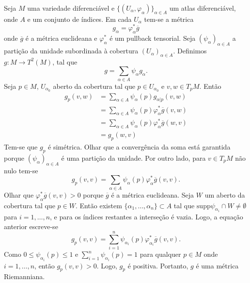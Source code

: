 \begin{demonstracao}
	Seja $M$ uma variedade diferenciável e $\{ (U_{\alpha}, \varphi_{\alpha}) \}_{\alpha \in A}$ um atlas diferenciável, onde $A$ e um conjunto de índices. Em cada $U_{\alpha}$ tem-se a métrica
	\begin{equation*}
		g_{\alpha} = \varphi_{\alpha}^* \overline{g}
	\end{equation*}
	onde $\overline{g}$ é a métrica euclideana e $\varphi_{\alpha}^*$ é um pullback tensorial. Seja $(\psi_{\alpha})_{\alpha \in A}$ a partição da unidade subordinada à cobertura $(U_{\alpha})_{\alpha \in A}$. Definimos $g: M \rightarrow T^2(M)$, tal que
	\begin{equation*}
		g = \sum_{\alpha \in A} \psi_{\alpha} g_{\alpha}.
	\end{equation*}
	Seja $p \in M$, $U_{\alpha_0}$ aberto da cobertura tal que $p \in U_{\alpha_0}$ e $v,w \in T_pM$. Então
	\begin{align*}
		g_p(v,w) &= \sum_{\alpha \in A} \psi_{\alpha}(p) g_{\alpha | p}(v,w)\\
		&= \sum_{\alpha \in A} \psi_{\alpha}(p) \varphi_{\alpha}^* \overline{g}(v,w)\\
		&= \sum_{\alpha \in A} \psi_{\alpha}(p) \varphi_{\alpha}^* \overline{g}(w,v)\\
		&= g_p(w,v)
	\end{align*}
	Tem-se que $g_p$ é simétrica. Olhar que a convergência da soma está garantida porque $(\psi_{\alpha})_{\alpha \in A}$ é uma partição da unidade. Por outro lado, para $v \in T_pM$ não nulo tem-se
	\begin{equation*}
		g_p(v,v) = \sum_{\alpha \in A} \psi_{\alpha}(p) \varphi_{\alpha}^* \overline{g}(v,v).
	\end{equation*}
	Olhar que $\varphi_{\alpha}^* \overline{g}(v,v) > 0$ porque $\overline{g}$ é a métrica euclideana. Seja $W$ um aberto da cobertura tal que $p \in W$. Então existem $\{ \alpha_1, \ldots, \alpha_n \} \subset A$ tal que $\text{supp} \psi_{\alpha_i} \cap W \neq \emptyset$ para $i=1, \ldots, n$, e para os índices restantes a interseção é vazia. Logo, a equação anterior escreve-se
	\begin{equation*}
	g_p(v,v) = \sum_{i=1}^n \psi_{\alpha_i}(p) \varphi_{\alpha_i}^* \overline{g}(v,v).
	\end{equation*}
	Como $0 \leq \psi_{\alpha_i}(p) \leq 1$ e $\sum_{i=1}^n \psi_{\alpha_i}(p) = 1$ para qualquer $p \in M$ onde $i=1,\ldots,n$, então $g_p(v,v) > 0$. Logo, $g_p$ é positiva. Portanto, $g$ é uma métrica Riemanniana.
\end{demonstracao}

